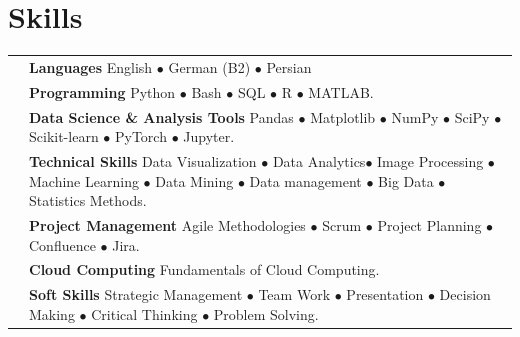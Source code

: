 \documentclass[oneside]{article}
\begin{document}
{\begin{minipage}[t][\textheight-2\fboxsep-2\fboxrule][t]{\dimexpr0.41\textwidth-2\fboxrule-2\fboxsep\relax}
        \section*{\large Skills}
        
        \begin{tabularx}{\textwidth}{@{}lX@{}} %
            \faLanguage{}   & \textbf{\footnotesize Languages} \newline English  $\bullet$  German (B2) $\bullet$ Persian \\
            
            \faCode{}        & \textbf{\footnotesize Programming} \newline Python $\bullet$ Bash $\bullet$ SQL $\bullet$  R $\bullet$ MATLAB. \\
            
            \faLaptopCode{}  & \textbf{\footnotesize Data Science \& Analysis Tools} \newline Pandas $\bullet$ Matplotlib $\bullet$  NumPy $\bullet$ SciPy $\bullet$ Scikit-learn $\bullet$ PyTorch $\bullet$ Jupyter. \\
            
            \faCogs{}        & \textbf{\footnotesize Technical Skills} \newline Data Visualization $\bullet$ Data Analytics$\bullet$ Image Processing $\bullet$ Machine Learning $\bullet$ Data Mining $\bullet$ Data management $\bullet$ Big Data $\bullet$ Statistics Methods. \\ %
            
            \faToolbox{}     & \textbf{\footnotesize Project Management} \newline Agile Methodologies $\bullet$ Scrum $\bullet$ Project Planning $\bullet$ Confluence $\bullet$ Jira. \\
            
            \faCloud{}       & \textbf{\footnotesize Cloud Computing}  \newline Fundamentals of Cloud Computing.%
            \\
        
            \faUsers{}       & \textbf{\footnotesize Soft Skills} \newline Strategic Management $\bullet$ Team Work $\bullet$ Presentation $\bullet$ Decision Making $\bullet$ Critical Thinking $\bullet$ Problem Solving. \\
        \end{tabularx}

        \vspace{1pt}
        
    \end{minipage}
}
\end{document}

